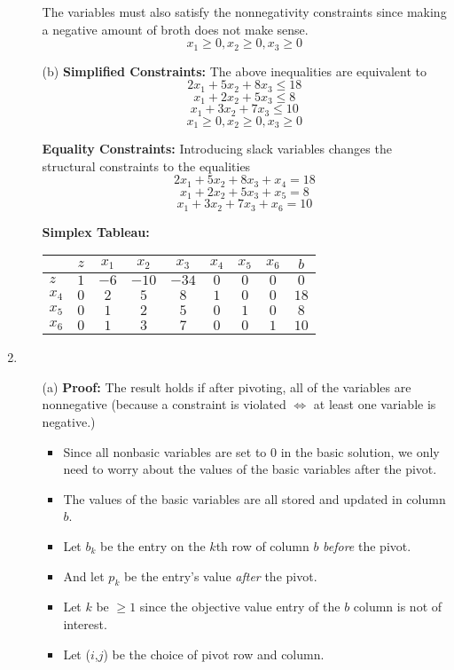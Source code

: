 \documentclass{article}[12pt,a4paper]
\begin{document}
\begin{enumerate}
\begin{enumerate}
   The variables must also satisfy the nonnegativity constraints since making a negative amount of broth does not make sense.
   $$x_1 \ge 0, x_2\ge 0, x_3 \ge 0$$ 
   
   \item[(b)] \textbf{Simplified Constraints:} The above inequalities are equivalent to
   $$2x_1  + 5x_2 + 8x_3 \le 18$$
   $$x_1 + 2x_2 + 5x_3 \le 8$$
   $$x_1 + 3x_2+ 7x_3 \le 10$$
   $$x_1 \ge 0, x_2\ge 0, x_3 \ge 0$$ 
   
   \textbf{Equality Constraints:} Introducing slack variables changes the structural constraints to the equalities
    $$2x_1  + 5x_2 + 8x_3 + x_4 = 18$$
   $$x_1 + 2x_2 + 5x_3 + x_5 = 8$$
   $$x_1 + 3x_2+ 7x_3 + x_6 = 10$$
  
  \textbf{Simplex Tableau:}
  \begin{center}
  \begin{tabular}{l | c c c c c c c | c}
             & $z$ & $x_1$ & $x_2$ & $x_3$ & $x_4$ & $x_5$ & $x_6$ & $b$ \\ \hline
  $z$     & $1$ & $-6$   & $-10$ & $-34$  & $0$     & $0$     & $0$     & $0$ \\ \hline
  $x_4$ & $0$ & $2$    & $5$    & $8$      & $1$     & $0$     & $0$     & $18$ \\
  $x_5$ & $0$ & $1$    & $2$    & $5$      & $0$     & $1$     & $0$     & $8$ \\
  $x_6$ & $0$ & $1$    & $3$    & $7$      & $0$     & $0$     & $1$     & $10$ \\
  \end{tabular}
  \end{center}

  \end{enumerate}
  \pagebreak
  \item
  \begin{enumerate}
  \item[(a)]
  \textbf{Proof:} The result holds if after pivoting, all of the variables are nonnegative (because a constraint is violated $\iff$
  at least one variable is negative.) 
  \begin{itemize}
  \item Since all nonbasic variables are set to $0$ in the basic solution, we only need to worry about the
  values of the basic variables after the pivot.
  \item The values of the basic variables are all stored and updated in column $b$.
  \item Let $b_k$ be the entry on the $k$th row of column $b$ \textit{before} the pivot. 
  \item And let $p_k$ be the entry's value \textit{after} the pivot.  
  \item  Let $k$ be $\ge 1$ since the objective value entry of the $b$ column is not of interest.
  \item Let ($i$,$j$) be the choice of pivot row and column. 
  

\end{itemize}
\end{enumerate}
\end{enumerate}
\end{document}
